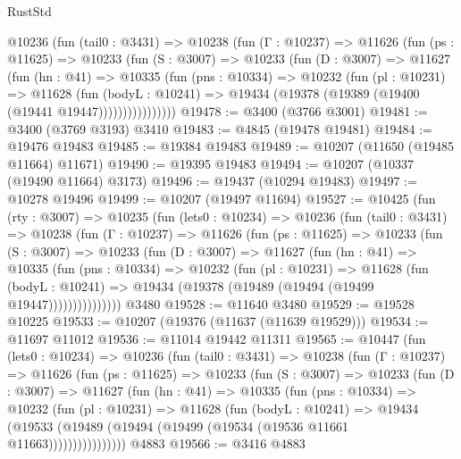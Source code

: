 \begin{lexlean}{RustStd}
\begin{coremodule}
        @10236
          (fun (tail0 : @3431) =>
          @10238
            (fun (Γ : @10237) =>
            @11626
              (fun (ps : @11625) =>
              @10233
                (fun (S : @3007) =>
                @10233
                  (fun (D : @3007) =>
                  @11627
                    (fun (hn : @41) =>
                    @10335
                      (fun (pns : @10334) =>
                      @10232
                        (fun (pl : @10231) =>
                        @11628
                          (fun (bodyL : @10241) =>
                          @19434 (@19378 (@19389 (@19400 (@19441 @19447))))))))))))))))
@19478 := @3400 (@3766 @3001)
@19481 := @3400 (@3769 @3193) @3410
@19483 := @4845 (@19478 @19481)
@19484 := @19476 @19483
@19485 := @19384 @19483
@19489 := @10207 (@11650 (@19485 @11664) @11671)
@19490 := @19395 @19483
@19494 := @10207 (@10337 (@19490 @11664) @3173)
@19496 := @19437 (@10294 @19483)
@19497 := @10278 @19496
@19499 := @10207 (@19497 @11694)
@19527 := @10425
    (fun (rty : @3007) =>
    @10235
      (fun (lets0 : @10234) =>
      @10236
        (fun (tail0 : @3431) =>
        @10238
          (fun (Γ : @10237) =>
          @11626
            (fun (ps : @11625) =>
            @10233
              (fun (S : @3007) =>
              @10233
                (fun (D : @3007) =>
                @11627
                  (fun (hn : @41) =>
                  @10335
                    (fun (pns : @10334) =>
                    @10232
                      (fun (pl : @10231) =>
                      @11628
                        (fun (bodyL : @10241) =>
                        @19434 (@19378 (@19489 (@19494 (@19499 @19447)))))))))))))))
    @3480
@19528 := @11640 @3480
@19529 := @19528 @10225
@19533 := @10207 (@19376 (@11637 (@11639 @19529)))
@19534 := @11697 @11012
@19536 := @11014 @19442 @11311
@19565 := @10447
    (fun (lets0 : @10234) =>
    @10236
      (fun (tail0 : @3431) =>
      @10238
        (fun (Γ : @10237) =>
        @11626
          (fun (ps : @11625) =>
          @10233
            (fun (S : @3007) =>
            @10233
              (fun (D : @3007) =>
              @11627
                (fun (hn : @41) =>
                @10335
                  (fun (pns : @10334) =>
                  @10232
                    (fun (pl : @10231) =>
                    @11628
                      (fun (bodyL : @10241) =>
                      @19434
                        (@19533
                          (@19489 (@19494 (@19499 (@19534 (@19536 @11661 @11663))))))))))))))))
    @4883
@19566 := @3416 @4883

\end{coremodule}
\end{lexlean}
